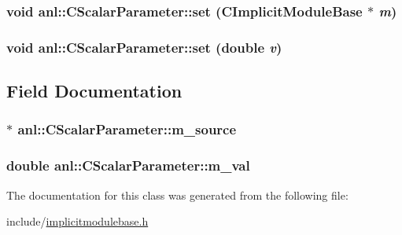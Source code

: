 \label{classanl_1_1CScalarParameter_af71bbcd788288e8b3f26940fd29262e0}
\hypertarget{classanl_1_1CScalarParameter_a615097c7cf0f57ba9e05f236bc134f25}{
\subsubsection[{set}]{\setlength{\rightskip}{0pt plus 5cm}void anl::CScalarParameter::set ({\bf CImplicitModuleBase} $\ast$ {\em m})}}
\label{classanl_1_1CScalarParameter_a615097c7cf0f57ba9e05f236bc134f25}
\hypertarget{classanl_1_1CScalarParameter_af3c5d0abdd8e85b43a4ac42bae2ac1ab}{
\subsubsection[{set}]{\setlength{\rightskip}{0pt plus 5cm}void anl::CScalarParameter::set (double {\em v})}}
\label{classanl_1_1CScalarParameter_af3c5d0abdd8e85b43a4ac42bae2ac1ab}


\subsection{Field Documentation}
\hypertarget{classanl_1_1CScalarParameter_ab87249eb99b6c1f7e548ed635db93e0e}{
\subsubsection[{m\_\-source}]{$\ast$ {\bf anl::CScalarParameter::m\_\-source}}}
\label{classanl_1_1CScalarParameter_ab87249eb99b6c1f7e548ed635db93e0e}
\hypertarget{classanl_1_1CScalarParameter_a6a61bde485c1ba665a60d44cb152cca3}{
\subsubsection[{m\_\-val}]{\setlength{\rightskip}{0pt plus 5cm}double {\bf anl::CScalarParameter::m\_\-val}}}
\label{classanl_1_1CScalarParameter_a6a61bde485c1ba665a60d44cb152cca3}


The documentation for this class was generated from the following file:\begin{DoxyCompactItemize}
\item 
include/\hyperlink{implicitmodulebase_8h}{implicitmodulebase.h}\end{DoxyCompactItemize}
